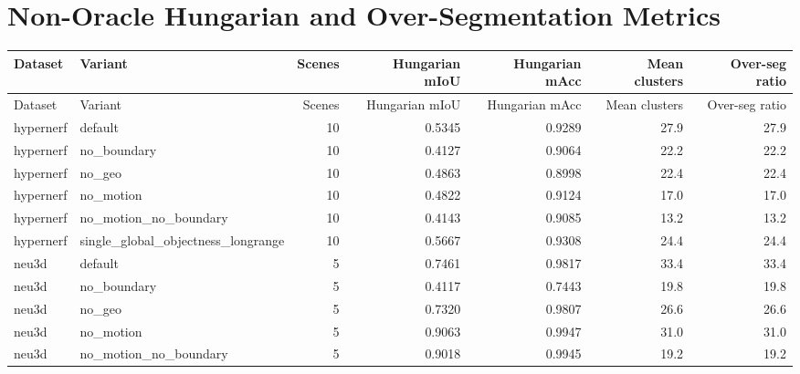 \documentclass[10pt]{article}
\begin{document}
\section{Non-Oracle Hungarian and Over-Segmentation Metrics}
\small
\begin{longtable}{llrrrrr}
\toprule
Dataset & Variant & Scenes & Hungarian mIoU & Hungarian mAcc & Mean clusters & Over-seg ratio \\
\midrule
\endfirsthead
\toprule
Dataset & Variant & Scenes & Hungarian mIoU & Hungarian mAcc & Mean clusters & Over-seg ratio \\
\midrule
\endhead
hypernerf & default & 10 & 0.5345 & 0.9289 & 27.9 & 27.9 \\
hypernerf & no\_boundary & 10 & 0.4127 & 0.9064 & 22.2 & 22.2 \\
hypernerf & no\_geo & 10 & 0.4863 & 0.8998 & 22.4 & 22.4 \\
hypernerf & no\_motion & 10 & 0.4822 & 0.9124 & 17.0 & 17.0 \\
hypernerf & no\_motion\_no\_boundary & 10 & 0.4143 & 0.9085 & 13.2 & 13.2 \\
hypernerf & single\_global\_objectness\_longrange & 10 & 0.5667 & 0.9308 & 24.4 & 24.4 \\
neu3d & default & 5 & 0.7461 & 0.9817 & 33.4 & 33.4 \\
neu3d & no\_boundary & 5 & 0.4117 & 0.7443 & 19.8 & 19.8 \\
neu3d & no\_geo & 5 & 0.7320 & 0.9807 & 26.6 & 26.6 \\
neu3d & no\_motion & 5 & 0.9063 & 0.9947 & 31.0 & 31.0 \\
neu3d & no\_motion\_no\_boundary & 5 & 0.9018 & 0.9945 & 19.2 & 19.2 \\
\bottomrule
\end{longtable}
\normalsize
\end{document}
